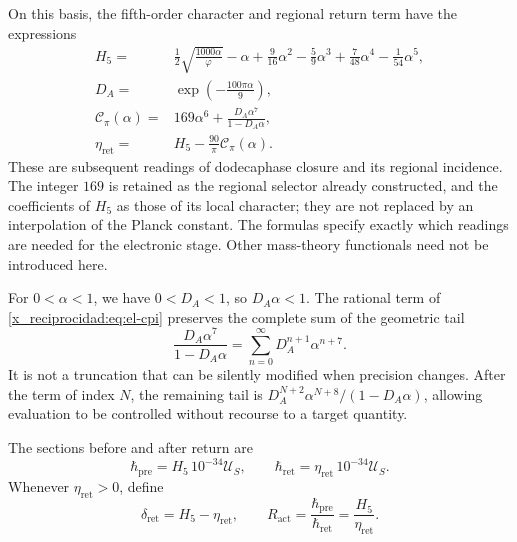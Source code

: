 On this basis, the fifth-order character and regional return term
have the expressions
\begin{align}
 H_5={}&\frac12\sqrt{\frac{1000\alpha}{\varphi}}-\alpha
   +\frac9{16}\alpha^2-\frac59\alpha^3
   +\frac7{48}\alpha^4-\frac1{54}\alpha^5,
   \label{x_reciprocidad:eq:el-h5}\\
 D_A={}&\exp\!\left(-\frac{100\pi\alpha}{9}\right),
   \label{x_reciprocidad:eq:el-da}\\
 \mathcal C_\pi(\alpha)={}&169\alpha^6+
       \frac{D_A\alpha^7}{1-D_A\alpha},
   \label{x_reciprocidad:eq:el-cpi}\\
 \eta_{\mathrm{ret}}={}&H_5-\frac{90}{\pi}\mathcal C_\pi(\alpha).
   \label{x_reciprocidad:eq:el-eta}
\end{align}
These are subsequent readings of dodecaphase closure and its regional incidence. The integer \(169\) is retained as the regional selector already constructed, and the coefficients of \(H_5\) as those of its local character; they are not replaced by an interpolation of the Planck constant. The formulas specify exactly which readings are needed for the electronic stage. Other mass-theory functionals need not be introduced here.

For \(0<\alpha<1\), we have \(0<D_A<1\), so \(D_A\alpha<1\). The rational term of \eqref{x_reciprocidad:eq:el-cpi} preserves the complete sum of the geometric tail
\begin{equation}
 \frac{D_A\alpha^7}{1-D_A\alpha}
 =\sum_{n=0}^{\infty}D_A^{n+1}\alpha^{n+7}.
 \label{x_reciprocidad:eq:el-cola-regional}
\end{equation}
It is not a truncation that can be silently modified when precision changes. After the term of index \(N\), the remaining tail is \(D_A^{N+2}\alpha^{N+8}/(1-D_A\alpha)\), allowing evaluation to be controlled without recourse to a target quantity.

\begin{definition}
The sections before and after return are
\begin{equation}
 \hbar_{\mathrm{pre}}=H_5\,10^{-34}\mathcal U_S,
 \qquad
 \hbar_{\mathrm{ret}}=\eta_{\mathrm{ret}}\,10^{-34}\mathcal U_S.
 \label{x_reciprocidad:eq:el-secciones-accion}
\end{equation}
Whenever \(\eta_{\mathrm{ret}}>0\), define
\begin{equation}
 \delta_{\mathrm{ret}}=H_5-\eta_{\mathrm{ret}},\qquad
 R_{\mathrm{act}}=\frac{\hbar_{\mathrm{pre}}}{\hbar_{\mathrm{ret}}}
 =\frac{H_5}{\eta_{\mathrm{ret}}}.
 \label{x_reciprocidad:eq:el-ratio}
\end{equation}
\end{definition}

